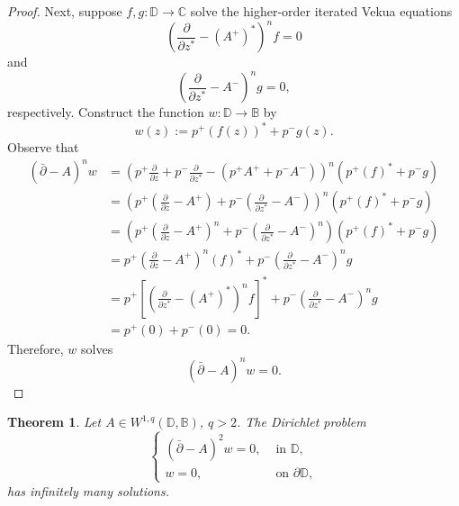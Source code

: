 \documentclass[12pt,reqno]{amsart}
\newtheorem{theorem}{Theorem}[section]
\theoremstyle{definition}
\theoremstyle{remark}
\newcommand{\p}{\partial}
\newcommand{\dbar}{\bar\partial}
\newcommand{\bc}{\mathbb{B}}
\newcommand{\disk}{\mathbb{D}}
\begin{document}
\begin{proof}
                Next, suppose $f, g : \disk \to \mathbb{C}$ solve the higher-order iterated Vekua equations
                \[
                    \left( \frac{\p }{\p z^*} - (A^+)^*\right)^n f = 0
                \]
                and 
                \[
                \left( \frac{\p}{\p z^*} - A^-\right)^n g= 0,
                \]
                respectively. Construct the function $w: \disk \to \bc$ by 
                \[
                    w(z) := p^+ (f(z))^* + p^- g(z).
                \]
                Observe that 
                \begin{align*}
                    (\dbar - A)^n w &= \left( p^+ \frac{\p}{\p z} + p^- \frac{\p}{\p z^*}- (p^+ A^+ + p^- A^-)\right)^n (p^+ (f)^* + p^- g)\\
                    &= \left( p^+ \left(\frac{\p}{\p z} - A^+\right)+ p^- \left(\frac{\p}{\p z^*} - A^-\right)\right)^n (p^+ (f)^* + p^- g)\\
                    &= \left( p^+  \left(\frac{\p}{\p z} - A^+\right)^n + p^- \left(\frac{\p}{\p z^*} - A^-\right)^n \right)(p^+ (f)^* + p^- g)\\
                    &= p^+ \left(\frac{\p}{\p z} - A^+\right)^n (f)^* + p^- \left(\frac{\p}{\p z^*} - A^-\right)^n g \\
                    &= p^+ \left[\left(\frac{\p}{\p z^*} - (A^+)^*\right)^n f \right]^* + p^- \left(\frac{\p}{\p z^*} - A^-\right)^n g \\
                    &= p^+ (0) + p^- ( 0) = 0. 
                \end{align*}
                Therefore, $w$ solves 
                \[
                    (\dbar-A)^n w = 0.
                \]
            \end{proof}

            \begin{theorem}\label{thm: bicomplexvekuabitsadzedirichletnotwelldefined}
            Let $A \in W^{1,q}(\disk,\bc)$, $q>2$. The Dirichlet problem 
            \begin{equation}\label{eq: bicomplexvekbitsadzedirchilet}
            \begin{cases}
                \left( \dbar - A \right)^2 w = 0, & \text{ in } \disk,\\
                w = 0, & \text{ on } \p\disk,
            \end{cases}
            \end{equation}
            has infinitely many solutions. 
            \end{theorem}
\end{document}
